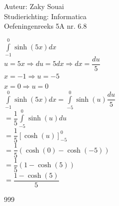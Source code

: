 \documentclass[a4paper]{article}
\newcommand{\Sinh}{\operatorname{sinh}}
\newcommand{\Cosh}{\operatorname{cosh}}
\begin{document}
  
\noindent \large Auteur: Zaky Souai \\
\noindent \large Studierichting:  Informatica\\
\noindent \large Oefeningenreeks 5A nr. 6.8\\

\bigskip

\normalsize

$ \displaystyle\int\limits_{-1}^{0} \Sinh(5x)dx $\\

$ u=5x \Rightarrow du=5dx \Rightarrow dx=\dfrac{du}{5}$\\

$ x=-1 \Rightarrow u=-5 $\\

$ x=0 \Rightarrow u=0 $\\

$ \displaystyle\int\limits_{-1}^{0}\Sinh(5x)dx = \displaystyle\int\limits_{-5}^{0}\Sinh(u)\dfrac{du}{5} $\\

$ = \dfrac{1}{5}\displaystyle\int\limits_{-5}^{0}\Sinh(u)du $\\

$ = \dfrac{1}{5}\left[\Cosh(u)\right]_{-5}^{0} $\\

$ = \dfrac{1}{5}\left(\Cosh(0)-\Cosh(-5)\right) $\\

$ = \dfrac{1}{5}\left(1-\Cosh(5)\right) $\\

$ = \dfrac{1-\Cosh(5)}{5} $\\

\begin{thebibliography}{999}
\end{thebibliography}
\end{document}
